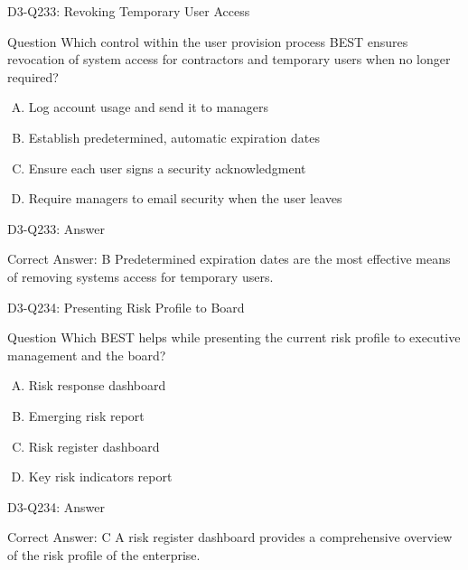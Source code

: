 \documentclass{beamer}
\begin{document}
	\begin{frame}{D3-Q233: Revoking Temporary User Access}
		\begin{block}{Question}
			Which control within the user provision process BEST ensures revocation of system access for contractors and temporary users when no longer required?
		\end{block}
		\begin{enumerate}[(A)]
			\item Log account usage and send it to managers
			\item Establish predetermined, automatic expiration dates
			\item Ensure each user signs a security acknowledgment
			\item Require managers to email security when the user leaves
		\end{enumerate}
	\end{frame}
	\begin{frame}{D3-Q233: Answer}
		\begin{block}{Correct Answer: B}
			Predetermined expiration dates are the most effective means of removing systems access for temporary users.
		\end{block}
	\end{frame}
	
	\begin{frame}{D3-Q234: Presenting Risk Profile to Board}
		\begin{block}{Question}
			Which BEST helps while presenting the current risk profile to executive management and the board?
		\end{block}
		\begin{enumerate}[(A)]
			\item Risk response dashboard
			\item Emerging risk report
			\item Risk register dashboard
			\item Key risk indicators report
		\end{enumerate}
	\end{frame}
	\begin{frame}{D3-Q234: Answer}
		\begin{block}{Correct Answer: C}
			A risk register dashboard provides a comprehensive overview of the risk profile of the enterprise.
		\end{block}
	\end{frame}
	
\end{document}

